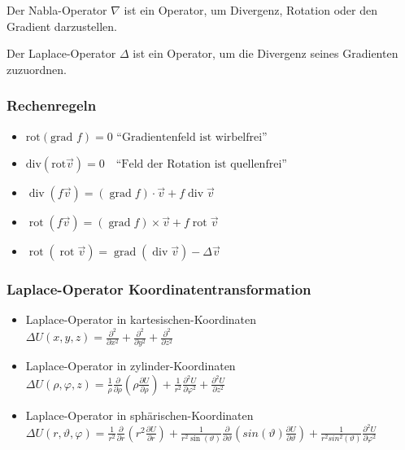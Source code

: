 \begin{minipage}[t]{0.48\columnwidth}
    Der Nabla-Operator $\nabla$ ist ein Operator, um Divergenz, Rotation oder den Gradient darzustellen.
\end{minipage}
\hfill
\begin{minipage}[t]{0.48\columnwidth}
    Der Laplace-Operator $\Delta$ ist ein Operator, um die Divergenz seines Gradienten zuzuordnen.
\end{minipage}

\subsubsection{Rechenregeln}
\begin{itemize}
    \item $\text{rot}(\text{grad }f)=0\text{ “Gradientenfeld ist wirbelfrei''}$
    \item $\mathrm{div}(\mathrm{rot}\vec{v})=0\quad\text{“Feld der Rotation ist quellenfrei''}$
    \item $\operatorname{div}(f\vec{v})=(\operatorname{grad}f)\cdot\vec{v}+f\operatorname{div}\vec{v}$
    \item $\operatorname{rot}(f\vec{v})=(\operatorname{grad}f)\times\vec{v}+f\operatorname{rot}\vec{v}$
    \item $\operatorname{rot}(\operatorname{rot}\vec{v})=\operatorname{grad}(\operatorname{div}\vec{v})-\Delta\vec{v}$
\end{itemize}

\subsubsection{Laplace-Operator Koordinatentransformation}
\begin{itemize}
    \item Laplace-Operator in kartesischen-Koordinaten\\
        $\boxed{\Delta U(x,y,z)=\frac{\partial^2}{\partial x^2}+\frac{\partial^2}{\partial y^2}+\frac{\partial^2}{\partial z^2}}$\\
    \item Laplace-Operator in zylinder-Koordinaten\\
        $\boxed{\Delta U(\rho,\varphi,z)=
        \frac1\rho\frac\partial{\partial\rho}\left(\rho\frac{\partial U}{\partial\rho}\right)+
        \frac1{r^2}\frac{\partial^2U}{\partial\varphi^2}+
        \frac{\partial^2U}{\partial z^2}}$\\
    \item Laplace-Operator in sphärischen-Koordinaten\\
        $\boxed{\Delta U(r,\vartheta,\varphi)=
        \frac{1}{r^{2}}\frac{\partial}{\partial r}\left(r^{2}\frac{\partial U}{\partial r}\right)+
        \frac{1}{r^{2}\sin(\vartheta)}\frac{\partial}{\partial\vartheta}\left(sin(\vartheta)\frac{\partial U}{\partial\vartheta}\right)+
        \frac{1}{r^{2}sin^{2}(\vartheta)}\frac{\partial^{2}U}{\partial\varphi^{2}}}$\\
\end{itemize}

